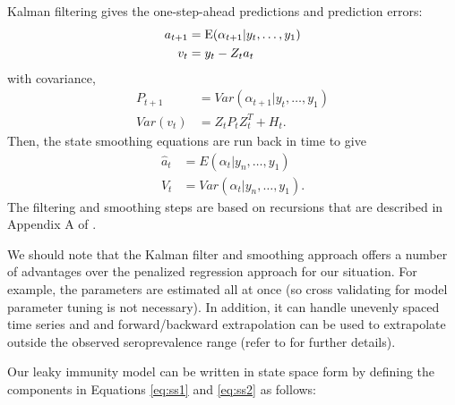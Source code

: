 \documentclass{article}
\begin{document}
Kalman filtering gives the one-step-ahead predictions and prediction errors:
\begin{align*}
a_{t+1} &= \textup{E}(\alpha_{t+1}|y_t, \dots, y_1) \\
v_t &= y_t - Z_ta_t
\end{align*} with covariance, 
\begin{align*}
P_{t+1} &= Var(\alpha_{t+1}|y_t, \dots, y_1) \\
Var(v_t) &= Z_tP_tZ_t^T + H_t.
\end{align*}
Then, the state smoothing equations are run back in time to give
\begin{align}
\hat{a}_t &= E(\alpha_{t}|y_n, \dots, y_1) \label{eq:hatat}\\
V_t &= Var(\alpha_{t}|y_n, \dots, y_1). \label{eq:Vt}
\end{align}
The filtering and smoothing steps are based on recursions that are described in Appendix A of \citep{helske2017kfas}. 

We should note that the Kalman filter and smoothing approach offers a number of advantages over the penalized regression approach for our situation. For example, the parameters are estimated all at once (so cross validating for model parameter tuning is not necessary). In addition, it can handle unevenly spaced time series and and forward/backward extrapolation can be used to extrapolate outside the observed seroprevalence range (refer to \citet{durbin2012time} for further details).

Our leaky immunity model can be written in state space form by defining the components in Equations \ref{eq:ss1} and \ref{eq:ss2} as follows:
\end{document}
